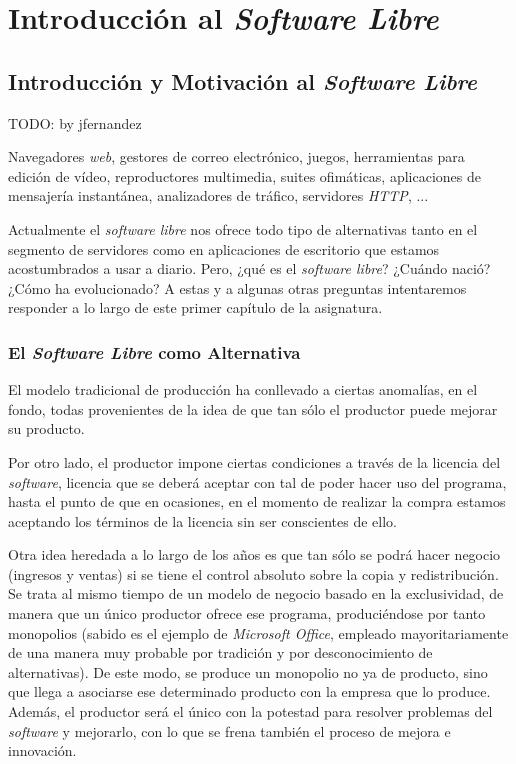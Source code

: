 \chapter{Introducción al \textit{Software Libre}}
\section{Introducción y Motivación al \textit{Software Libre}}

TODO: by jfernandez

Navegadores \textit{web}, gestores de correo electrónico, juegos, herramientas
para edición de vídeo, reproductores multimedia, suites ofimáticas, aplicaciones
de mensajería instantánea, analizadores de tráfico, servidores \textit{HTTP},
...

Actualmente el \textit{software libre} nos ofrece todo tipo de alternativas
tanto en el segmento de servidores como en aplicaciones de escritorio que
estamos acostumbrados a usar a diario. Pero, ¿qué es el \textit{software libre}?
¿Cuándo nació? ¿Cómo ha evolucionado? A estas y a algunas otras preguntas
intentaremos responder a lo largo de este primer capítulo de la asignatura.

\subsection{El \textit{Software Libre} como Alternativa}

El modelo tradicional de producción ha conllevado a ciertas anomalías, en el
fondo, todas provenientes de la idea de que tan sólo el productor puede mejorar
su producto.

Por otro lado, el productor impone ciertas condiciones a través de
la licencia del \textit{software}, licencia que se deberá aceptar con tal de
poder hacer uso del programa, hasta el punto de que en ocasiones, en el momento
de realizar la compra estamos aceptando los términos de la licencia sin ser
conscientes de ello.

Otra idea heredada a lo largo de los años es que tan sólo se podrá hacer
negocio (ingresos y ventas) si se tiene el control absoluto sobre la copia y
redistribución. Se trata al mismo tiempo de un modelo de negocio basado en la
exclusividad, de manera que un único productor ofrece ese programa,
produciéndose por tanto monopolios (sabido es el ejemplo de \textit{Microsoft
Office}, empleado mayoritariamente de una manera muy probable por tradición y
por desconocimiento de alternativas). De este modo, se produce un
monopolio no ya de producto, sino que llega a asociarse ese determinado
producto con la empresa que lo produce. Además, el productor será el único con
la potestad para resolver problemas del \textit{software} y mejorarlo, con lo
que se frena también el proceso de mejora e innovación.

